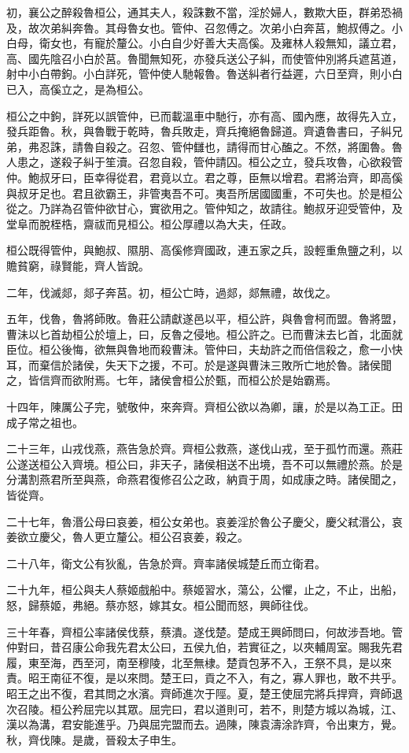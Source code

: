 初，襄公之醉殺魯桓公，通其夫人，殺誅數不當，淫於婦人，數欺大臣，群弟恐禍及，故次弟糾奔魯。其母魯女也。管仲、召忽傅之。次弟小白奔莒，鮑叔傅之。小白母，衛女也，有寵於釐公。小白自少好善大夫高傒。及雍林人殺無知，議立君，高、國先陰召小白於莒。魯聞無知死，亦發兵送公子糾，而使管仲別將兵遮莒道，射中小白帶鉤。小白詳死，管仲使人馳報魯。魯送糾者行益遲，六日至齊，則小白已入，高傒立之，是為桓公。

桓公之中鉤，詳死以誤管仲，已而載溫車中馳行，亦有高、國內應，故得先入立，發兵距魯。秋，與魯戰于乾時，魯兵敗走，齊兵掩絕魯歸道。齊遺魯書曰，子糾兄弟，弗忍誅，請魯自殺之。召忽、管仲讎也，請得而甘心醢之。不然，將圍魯。魯人患之，遂殺子糾于笙瀆。召忽自殺，管仲請囚。桓公之立，發兵攻魯，心欲殺管仲。鮑叔牙曰，臣幸得從君，君竟以立。君之尊，臣無以增君。君將治齊，即高傒與叔牙足也。君且欲霸王，非管夷吾不可。夷吾所居國國重，不可失也。於是桓公從之。乃詳為召管仲欲甘心，實欲用之。管仲知之，故請往。鮑叔牙迎受管仲，及堂阜而脫桎梏，齋祓而見桓公。桓公厚禮以為大夫，任政。

桓公既得管仲，與鮑叔、隰朋、高傒修齊國政，連五家之兵，設輕重魚鹽之利，以贍貧窮，祿賢能，齊人皆說。

二年，伐滅郯，郯子奔莒。初，桓公亡時，過郯，郯無禮，故伐之。

五年，伐魯，魯將師敗。魯莊公請獻遂邑以平，桓公許，與魯會柯而盟。魯將盟，曹沬以匕首劫桓公於壇上，曰，反魯之侵地。桓公許之。已而曹沬去匕首，北面就臣位。桓公後悔，欲無與魯地而殺曹沬。管仲曰，夫劫許之而倍信殺之，愈一小快耳，而棄信於諸侯，失天下之援，不可。於是遂與曹沬三敗所亡地於魯。諸侯聞之，皆信齊而欲附焉。七年，諸侯會桓公於甄，而桓公於是始霸焉。

十四年，陳厲公子完，號敬仲，來奔齊。齊桓公欲以為卿，讓，於是以為工正。田成子常之祖也。

二十三年，山戎伐燕，燕告急於齊。齊桓公救燕，遂伐山戎，至于孤竹而還。燕莊公遂送桓公入齊境。桓公曰，非天子，諸侯相送不出境，吾不可以無禮於燕。於是分溝割燕君所至與燕，命燕君復修召公之政，納貢于周，如成康之時。諸侯聞之，皆從齊。

二十七年，魯湣公母曰哀姜，桓公女弟也。哀姜淫於魯公子慶父，慶父弒湣公，哀姜欲立慶父，魯人更立釐公。桓公召哀姜，殺之。

二十八年，衛文公有狄亂，告急於齊。齊率諸侯城楚丘而立衛君。

二十九年，桓公與夫人蔡姬戲船中。蔡姬習水，蕩公，公懼，止之，不止，出船，怒，歸蔡姬，弗絕。蔡亦怒，嫁其女。桓公聞而怒，興師往伐。

三十年春，齊桓公率諸侯伐蔡，蔡潰。遂伐楚。楚成王興師問曰，何故涉吾地。管仲對曰，昔召康公命我先君太公曰，五侯九伯，若實征之，以夾輔周室。賜我先君履，東至海，西至河，南至穆陵，北至無棣。楚貢包茅不入，王祭不具，是以來責。昭王南征不復，是以來問。楚王曰，貢之不入，有之，寡人罪也，敢不共乎。昭王之出不復，君其問之水濱。齊師進次于陘。夏，楚王使屈完將兵捍齊，齊師退次召陵。桓公矜屈完以其眾。屈完曰，君以道則可，若不，則楚方城以為城，江、漢以為溝，君安能進乎。乃與屈完盟而去。過陳，陳袁濤涂詐齊，令出東方，覺。秋，齊伐陳。是歲，晉殺太子申生。

